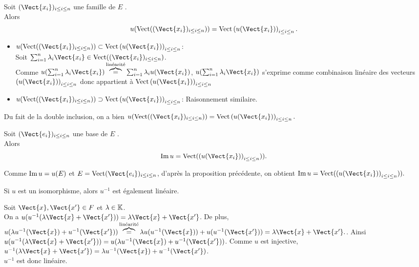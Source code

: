 \documentclass{book}
\begin{document}
\begin{Proposition}
Soit $(\Vect{x_i})_{i\leq i \leq n }$ une famille de $E$ .\\
Alors $$ u(\text{Vect}((\Vect{x_i})_{i\leq i \leq n}))=\text{Vect}\left(u(\Vect{x_i})\right)_{i\leq i \leq n}.$$
\end{Proposition}
\begin{Demonstration}
\begin{itemize}
\item  $u(\text{Vect}((\Vect{x_i})_{i\leq i \leq n}))\subset\text{Vect}\left(u(\Vect{x_i})\right)_{i\leq i \leq n}$:\\
Soit $\sum_{i=1}^n \lambda_i \Vect{x_i}\in \text{Vect}((\Vect{x_i})_{i\leq i \leq n})$.\\
Comme $u(\sum_{i=1}^n \lambda_i \Vect{x_i})\overbrace{=}^{\text{linéarité}}\sum_{i=1}^n \lambda_i u( \Vect{x_i})$, $u(\sum_{i=1}^n \lambda_i \Vect{x_i})$ s'exprime comme combinaison linéaire des vecteurs $\left(u(\Vect{x_i})\right)_{i\leq i \leq n}$ donc appartient à $\text{Vect}\left(u(\Vect{x_i})\right)_{i\leq i \leq n}$
\item $u(\text{Vect}((\Vect{x_i})_{i\leq i \leq n}))\supset\text{Vect}\left(u(\Vect{x_i})\right)_{i\leq i \leq n}$: Raisonnement similaire.
\end{itemize}
Du fait de la double inclusion, on a bien $ u(\text{Vect}((\Vect{x_i})_{i\leq i \leq n}))=\text{Vect}\left(u(\Vect{x_i})\right)_{i\leq i \leq n}.$
\end{Demonstration}
\begin{Corollaire}
Soit $(\Vect{e_i})_{i\leq i \leq n}$ une base de $E$ .\\
Alors $$ \Ima u =\text{Vect}( \left(u(\Vect{x_i})\right)_{i\leq i \leq n})).$$
\end{Corollaire}
\begin{Demonstration}
Comme $ \operatorname{Im} u =u(E)$ et $E=\text{Vect}(\Vect{e_i})_{i\leq i \leq n }$, d'après la proposition précédente, on obtient $ \Ima u =\text{Vect}( \left(u(\Vect{x_i})\right)_{i\leq i \leq n})).$
\end{Demonstration}

\begin{Proposition}
Si $u$ est un isomorphisme, alors $u^{-1}$ est également linéaire.
\end{Proposition}
\begin{Demonstration}  
Soit $\Vect{x},\Vect{x'}\in F $ et $\lambda\in\mathbb{K}$.\\
On a $u(u^{-1}(\lambda\Vect{x}+\Vect{x'}))=\lambda\Vect{x}+\Vect{x'}$. De plus, $u(\lambda u^{-1}(\Vect{x})+ u^{-1}(\Vect{x'}))\overbrace{=}^{\text{linéarité}}\lambda u( u^{-1}(\Vect{x}))+ u(u^{-1}(\Vect{x'}))=\lambda\Vect{x}+\Vect{x'}.$. Ainsi $u(u^{-1}(\lambda\Vect{x}+\Vect{x'}))=u(\lambda u^{-1}(\Vect{x})+ u^{-1}(\Vect{x'}))$. Comme $u$ est injective,  $u^{-1}(\lambda\Vect{x}+\Vect{x'})=\lambda u^{-1}(\Vect{x})+ u^{-1}(\Vect{x'})$.\\
 $u^{-1}$ est donc linéaire.
\end{Demonstration}
\end{document}
